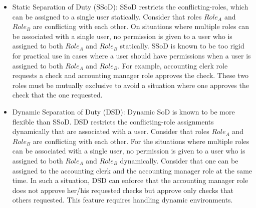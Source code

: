 \begin{itemize}
	\item Static Separation of Duty (SSoD): SSoD restricts the conflicting-roles, which can be assigned to a single user statically. Consider that roles $Role_A$ and $Role_B$ are conflicting with each other. On situations
	where multiple roles can be associated with a single user, no permission is given to a user who is assigned to both $Role_A$ and $Role_B$ statically. SSoD is known to be too rigid for practical use in cases where a user should have permissions when a user is assigned to both $Role_A$ and $Role_B$.
	For example, accounting clerk role requests a check and accounting manager role approves the check. These two roles must be
	mutually exclusive to avoid a situation where one approves the check that the one requested.
	
	\item Dynamic Separation of Duty (DSD): Dynamic SoD is known to be
more flexible than SSoD. DSD restricts the conflicting-role assignments dynamically that are associated with a user. Consider that roles $Role_A$ and $Role_B$ are conflicting with each other. For the situations where multiple roles can be associated with a single user, no permission is given to a user who is assigned to both $Role_A$ and $Role_B$ dynamically.	
Consider that one can be assigned to the accounting clerk and the accounting manager role at the same time.
In such a situation, DSD can enforce that the accounting manager role does not approve her/his requested checks but
approve only checks that others requested. This feature requires handling dynamic environments.
\end{itemize}
